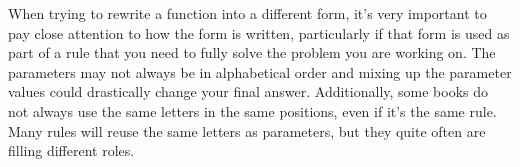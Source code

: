 When trying to rewrite a function into a different form, it's very important to pay close attention to how the form is written, particularly if that form is used as part of a rule that you need to fully solve the problem you are working on. The parameters may not always be in alphabetical order and mixing up the parameter values could drastically change your final answer. Additionally, some books do not always use the same letters in the same positions, even if it's the same rule. Many rules will reuse the same letters as parameters, but they quite often are filling different roles.





